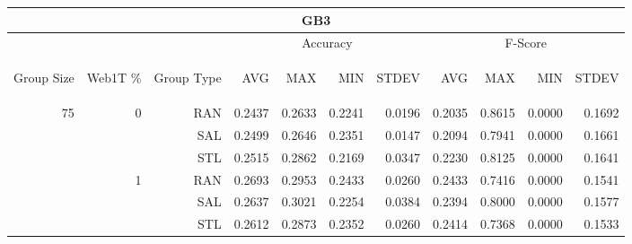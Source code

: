 \begin{center}
\begin{table}[htbp]
\begin{tabular}{ | r | r | r | r | r | r | r | r | r | r | r |}
\hline
\multicolumn{11}{|c|}{GB3}\\
\hline
 & & & \multicolumn{4}{|c|}{Accuracy} & \multicolumn{4}{|c|}{F-Score}\\ \cline{4-11}
\begin{sideways}Group Size\end{sideways} & \begin{sideways}Web1T \%\end{sideways} & \begin{sideways}Group Type\end{sideways} & \begin{sideways}AVG\end{sideways} & \begin{sideways}MAX\end{sideways} & \begin{sideways}MIN\end{sideways} & \begin{sideways}STDEV\end{sideways} & \begin{sideways}AVG\end{sideways} & \begin{sideways}MAX\end{sideways} & \begin{sideways}MIN\end{sideways} & \begin{sideways}STDEV\end{sideways}\\
\hline
\multirow{18}{*}{75}
 & \multirow{3}{*}{0} & RAN & 0.2437 & 0.2633 & 0.2241 & 0.0196 & 0.2035 & 0.8615 & 0.0000 & 0.1692\\ \cline{3-11}
 &   & SAL & 0.2499 & 0.2646 & 0.2351 & 0.0147 & 0.2094 & 0.7941 & 0.0000 & 0.1661\\ \cline{3-11}
 &   & STL & 0.2515 & 0.2862 & 0.2169 & 0.0347 & 0.2230 & 0.8125 & 0.0000 & 0.1641\\ \cline{2-11}
 & \multirow{3}{*}{1} & RAN & 0.2693 & 0.2953 & 0.2433 & 0.0260 & 0.2433 & 0.7416 & 0.0000 & 0.1541\\ \cline{3-11}
 &   & SAL & 0.2637 & 0.3021 & 0.2254 & 0.0384 & 0.2394 & 0.8000 & 0.0000 & 0.1577\\ \cline{3-11}
 &   & STL & 0.2612 & 0.2873 & 0.2352 & 0.0260 & 0.2414 & 0.7368 & 0.0000 & 0.1533\\ \cline{2-11}

\end{tabular}
\end{table}
\end{center}
